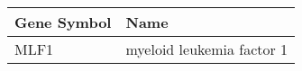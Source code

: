 \begin{tabular}{ll}
\toprule
Gene Symbol &                      Name \\
\midrule
       MLF1 & myeloid leukemia factor 1 \\
\bottomrule
\end{tabular}
